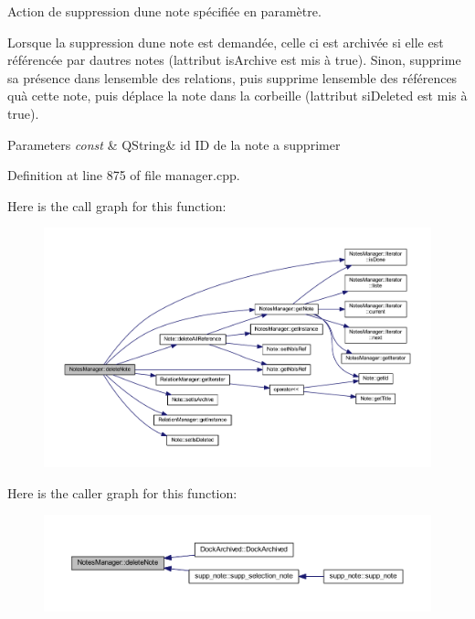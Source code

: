 Action de suppression d\textquotesingle{}une note spécifiée en paramètre. 

Lorsque la suppression d\textquotesingle{}une note est demandée, celle ci est archivée si elle est référencée par d\textquotesingle{}autres notes (l\textquotesingle{}attribut is\+Archive est mis à true). Sinon, supprime sa présence dans l\textquotesingle{}ensemble des relations, puis supprime l\textquotesingle{}ensemble des références qu\textquotesingle{}à cette note, puis déplace la note dans la corbeille (l\textquotesingle{}attribut si\+Deleted est mis à true). 
\begin{DoxyParams}{Parameters}
{\em const} & Q\+String\& id ID de la note a supprimer \\
\hline
\end{DoxyParams}


Definition at line 875 of file manager.\+cpp.

Here is the call graph for this function\+:\nopagebreak
\begin{figure}[H]
\begin{center}
\leavevmode
\includegraphics[width=350pt]{class_notes_manager_a989429244c36c35ef68204f6ae2a0a5f_cgraph}
\end{center}
\end{figure}
Here is the caller graph for this function\+:\nopagebreak
\begin{figure}[H]
\begin{center}
\leavevmode
\includegraphics[width=350pt]{class_notes_manager_a989429244c36c35ef68204f6ae2a0a5f_icgraph}
\end{center}
\end{figure}
\mbox{\label{class_notes_manager_a3259c7aa22b5f2eee6f7bceddc707b1d}} 
